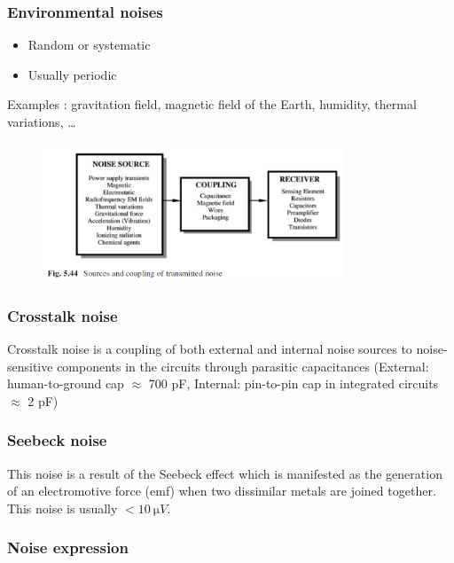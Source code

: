 \subsubsection{Environmental noises}

\begin{itemize}
    \item Random or systematic
    \item Usually periodic
\end{itemize}

Examples : gravitation field, magnetic field of the Earth, humidity, thermal variations, \dots

\begin{figure}[H]
    \centering
    \includegraphics[width = 0.8\textwidth]{L3/img/environmental-noise.PNG}
\end{figure}

\subsubsection{Crosstalk noise}

Crosstalk noise is a coupling of both external and internal noise
sources to noise-sensitive components in the
circuits through parasitic capacitances (External: human-to-ground cap $\approx$ 700 pF, Internal: pin-to-pin cap in integrated circuits $\approx$ 2 pF)

\subsubsection{Seebeck noise}

This noise is a result of the Seebeck effect which is manifested as the generation of an electromotive force (emf) when two dissimilar metals are joined together. This noise is usually $< \SI{10}{\micro V}$.

\subsubsection{Noise expression}

